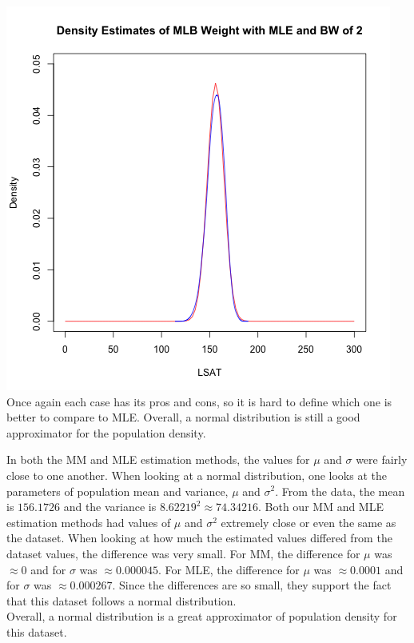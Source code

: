 \documentclass[12pt, letterpaper]{article}
\begin{document}
\includegraphics[scale=0.85]{Lawschool_LSAT_Density_mlebw} \\
Once again each case has its pros and cons, so it is hard to define which one is better to compare to MLE. Overall, a normal distribution is still a good approximator for the population density. 

\newpage
\noindent
In both the MM and MLE estimation methods, the values for $\mu$ and $\sigma$ were fairly close to one another. When looking at a normal distribution, one looks at the parameters of population mean and variance, $\mu$ and $\sigma^2$. From the data, the mean is $156.1726$ and the variance is $ 8.62219^2 \approx 74.34216$. Both our MM and MLE estimation methods had values of $\mu$ and $\sigma^2$ extremely close or even the same as the dataset. When looking at how much the estimated values differed from the dataset values, the difference was very small. For MM, the difference for $\mu$ was $\approx 0$ and for $\sigma$ was $\approx 0.000045$. For MLE, the difference for $\mu$ was $\approx 0.0001$ and for $\sigma$ was $\approx 0.000267$. Since the differences are so small, they support the fact that this dataset follows a normal distribution. \\
Overall, a normal distribution is a great approximator of population density for this dataset.  

\newpage
\noindent
\end{document}
